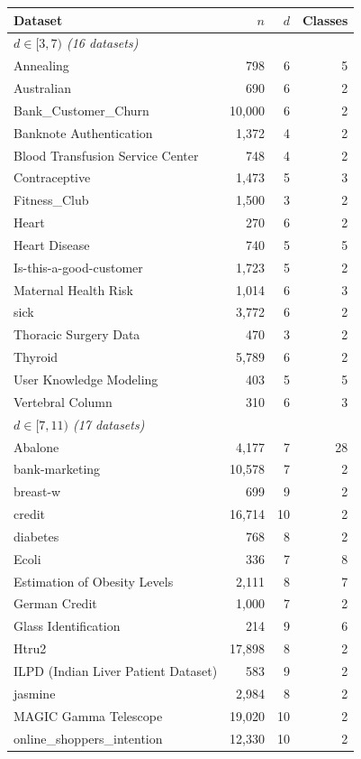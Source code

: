 \begin{tabular}{lrrr}
\toprule
Dataset & $n$ & $d$ & Classes \\
\midrule
\multicolumn{4}{l}{\emph{$d \in [3,7)$ (16 datasets)}} \\
Annealing & 798 & 6 & 5 \\
Australian & 690 & 6 & 2 \\
Bank\_Customer\_Churn & 10{,}000 & 6 & 2 \\
Banknote Authentication & 1{,}372 & 4 & 2 \\
Blood Transfusion Service Center & 748 & 4 & 2 \\
Contraceptive & 1{,}473 & 5 & 3 \\
Fitness\_Club & 1{,}500 & 3 & 2 \\
Heart & 270 & 6 & 2 \\
Heart Disease & 740 & 5 & 5 \\
Is-this-a-good-customer & 1{,}723 & 5 & 2 \\
Maternal Health Risk & 1{,}014 & 6 & 3 \\
sick & 3{,}772 & 6 & 2 \\
Thoracic Surgery Data & 470 & 3 & 2 \\
Thyroid & 5{,}789 & 6 & 2 \\
User Knowledge Modeling & 403 & 5 & 5 \\
Vertebral Column & 310 & 6 & 3 \\
\midrule
\multicolumn{4}{l}{\emph{$d \in [7,11)$ (17 datasets)}} \\
Abalone & 4{,}177 & 7 & 28 \\
bank-marketing & 10{,}578 & 7 & 2 \\
breast-w & 699 & 9 & 2 \\
credit & 16{,}714 & 10 & 2 \\
diabetes & 768 & 8 & 2 \\
Ecoli & 336 & 7 & 8 \\
Estimation of Obesity Levels & 2{,}111 & 8 & 7 \\
German Credit & 1{,}000 & 7 & 2 \\
Glass Identification & 214 & 9 & 6 \\
Htru2 & 17{,}898 & 8 & 2 \\
ILPD (Indian Liver Patient Dataset) & 583 & 9 & 2 \\
jasmine & 2{,}984 & 8 & 2 \\
MAGIC Gamma Telescope & 19{,}020 & 10 & 2 \\
online\_shoppers\_intention & 12{,}330 & 10 & 2 \\

\end{tabular}
